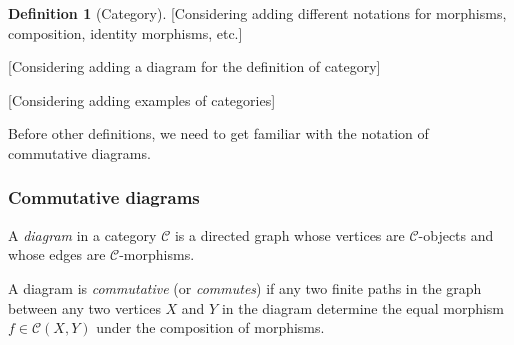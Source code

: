 \documentclass[12pt,twoside,a4paper]{report}
\theoremstyle{definition}
\newtheorem*{definition*}{Definition}
\begin{document}
\begin{definition*}[Category]
            [Considering adding different notations for morphisms, composition, identity morphisms, etc.]

            [Considering adding a diagram for the definition of category]

            [Considering adding examples of categories]

        \end{definition*}

        Before other definitions, we need to get familiar with the notation of commutative diagrams.
        \subsubsection{Commutative diagrams}
        A \emph{diagram} in a category $\mathcal{C}$ is a directed graph whose vertices are $\mathcal{C}$-objects and whose edges are $\mathcal{C}$-morphisms.

        A diagram is \emph{commutative} (or \emph{commutes}) if any two finite paths in the graph between any two vertices $X$ and $Y$ in the diagram determine the equal morphism $f \in \mathcal{C}{(X,Y)}$ under the composition of morphisms.
\end{document}
